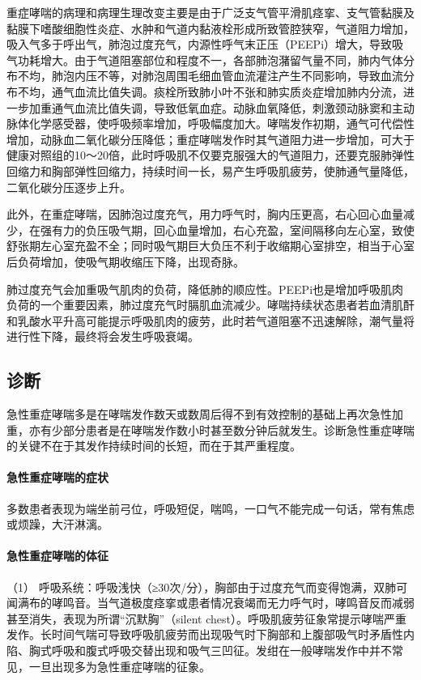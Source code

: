 重症哮喘的病理和病理生理改变主要是由于广泛支气管平滑肌痉挛、支气管黏膜及黏膜下嗜酸细胞性炎症、水肿和气道内黏液栓形成所致管腔狭窄，气道阻力增加，吸入气多于呼出气，肺泡过度充气，内源性呼气末正压（PEEPi）增大，导致吸气功耗增大。由于气道阻塞部位和程度不一，各部肺泡潴留气量不同，肺内气体分布不均，肺泡内压不等，对肺泡周围毛细血管血流灌注产生不同影响，导致血流分布不均，通气血流比值失调。痰栓所致肺小叶不张和肺实质炎症增加肺内分流，进一步加重通气血流比值失调，导致低氧血症。动脉血氧降低，刺激颈动脉窦和主动脉体化学感受器，使呼吸频率增加，呼吸幅度加大。哮喘发作初期，通气可代偿性增加，动脉血二氧化碳分压降低；重症哮喘发作时其气道阻力进一步增加，可大于健康对照组的10～20倍，此时呼吸肌不仅要克服强大的气道阻力，还要克服肺弹性回缩力和胸部弹性回缩力，持续时间一长，易产生呼吸肌疲劳，使肺通气量降低，二氧化碳分压逐步上升。

此外，在重症哮喘，因肺泡过度充气，用力呼气时，胸内压更高，右心回心血量减少，在强有力的负压吸气期，回心血量增加，右心充盈，室间隔移向左心室，致使舒张期左心室充盈不全；同时吸气期巨大负压不利于收缩期心室排空，相当于心室后负荷增加，使吸气期收缩压下降，出现奇脉。

肺过度充气会加重吸气肌肉的负荷，降低肺的顺应性。PEEPi也是增加呼吸肌肉负荷的一个重要因素，肺过度充气时膈肌血流减少。哮喘持续状态患者若血清肌酐和乳酸水平升高可能提示呼吸肌肉的疲劳，此时若气道阻塞不迅速解除，潮气量将进行性下降，最终将会发生呼吸衰竭。

\subsection{诊断}

急性重症哮喘多是在哮喘发作数天或数周后得不到有效控制的基础上再次急性加重，亦有少部分患者是在哮喘发作数小时甚至数分钟后就发生。诊断急性重症哮喘的关键不在于其发作持续时间的长短，而在于其严重程度。

\paragraph{急性重症哮喘的症状}

多数患者表现为端坐前弓位，呼吸短促，喘鸣，一口气不能完成一句话，常有焦虑或烦躁，大汗淋漓。

\paragraph{急性重症哮喘的体征}

（1）
呼吸系统：呼吸浅快（≥30次/分），胸部由于过度充气而变得饱满，双肺可闻满布的哮鸣音。当气道极度痉挛或患者情况衰竭而无力呼气时，哮鸣音反而减弱甚至消失，表现为所谓“沉默胸”（silent
chest）。呼吸肌疲劳征象常提示哮喘严重发作。长时间气喘可导致呼吸肌疲劳而出现吸气时下胸部和上腹部吸气时矛盾性内陷、胸式呼吸和腹式呼吸交替出现和吸气三凹征。发绀在一般哮喘发作中并不常见，一旦出现多为急性重症哮喘的征象。

